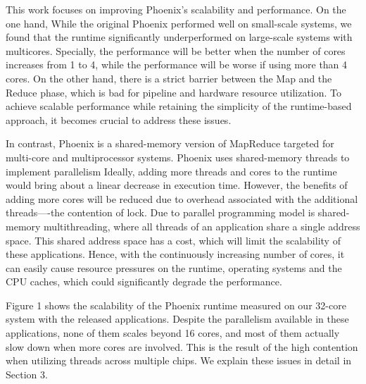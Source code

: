 This work focuses on improving Phoenix\cite{ranger2007phoenix}'s scalability and performance.
On the one hand, 
While the original Phoenix performed well on small-scale systems,
we found that the runtime significantly underperformed on large-scale systems with multicores.
Specially, the performance will be better 
when the number of cores increases from 1 to 4, 
while the performance will be worse if using more than 4 cores. 
On the other hand,
there is a strict barrier between the Map and the
Reduce phase, which is bad for pipeline and hardware resource utilization.
To achieve scalable performance while retaining
the simplicity of the runtime-based approach, 
it becomes crucial to address these issues.

In contrast, Phoenix is a shared-memory version of
MapReduce targeted for multi-core and multiprocessor systems.
Phoenix uses shared-memory threads to implement parallelism
Ideally, adding more threads and cores to the runtime
would bring about a linear decrease in execution time.
However, the benefits of adding more
cores will be reduced due to overhead associated with the
additional threads----the contention of lock.
Due to parallel programming model is shared-memory multithreading, 
where all threads of an application share a single address space. 
This shared address space has a
cost, which will limit the scalability of these applications. 
Hence, with the continuously increasing
number of cores, it can easily cause resource pressures on the
runtime, operating systems and the CPU caches, 
which could significantly degrade the performance. 


Figure 1 shows the scalability of the Phoenix runtime
measured on our 32-core system with the released applications. 
Despite the parallelism available in these applications, 
none of them scales beyond 16 cores, and most of them actually slow down when
more cores are involved. This is the result of the high contention 
when utilizing threads across multiple chips. We explain these issues
in detail in Section 3.

